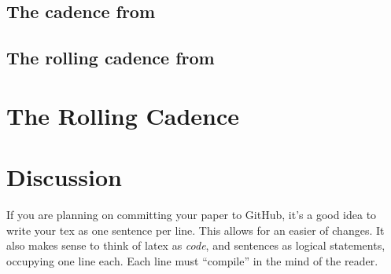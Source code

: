 \documentclass[\docopts]{\docclass}
\begin{document}
\subsection{The cadence from }
\label{sec:results}



\subsection{The rolling cadence from }
\label{sec:results}


\section{The Rolling Cadence }
\label{sec:results}







\section{Discussion}
\label{sec:discussion}

If you are planning on committing your paper to GitHub, it's a good idea to write your tex as one sentence per line.
This allows for an easier  of changes.
It also makes sense to think of latex as \emph{code}, and sentences as logical statements, occupying one line each.
Each line must ``compile'' in the mind of the reader.
\end{document}
